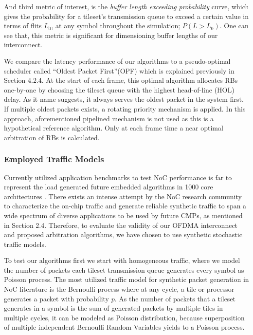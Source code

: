 And third metric of interest, is the \textit{buffer length exceeding probability} curve, which gives the probability for a tileset's transmission queue to exceed a certain value in terms of flits $L_{0}$, at any symbol throughout the simulation; $P(L>L_{0})$. One can see that, this metric is significant for dimensioning buffer lengths of our interconnect.

We compare the latency performance of our algorithms to a pseudo-optimal scheduler called \textquotedblleft Oldest Packet First\textquotedblright (OPF) which is explained previously in Section 4.2.4. At the start of each frame, this optimal algorithm allocates RBs one-by-one by choosing the tileset queue with the highest head-of-line (HOL) delay. As it name suggests, it always serves the oldest packet in the system first. If multiple oldest packets exists, a rotating priority mechanism is applied. In this approach, aforementioned pipelined mechanism is not used as this is a hypothetical reference algorithm. Only at each frame time a near optimal arbitration of RBs is calculated.  

\subsubsection{Employed Traffic Models}

Currently utilized application benchmarks to test NoC performance is far to represent the load generated future embedded algorithms in 1000 core architectures \cite{kurian2010atac}\cite{bienia2008parsec}\cite{woo1995splash}. There exists an intense attempt by the NoC research community to characterize the on-chip traffic and generate reliable synthetic traffic to span a wide spectrum of diverse applications to be used by future CMPs, as mentioned in Section 2.4. Therefore, to evaluate the validity of our OFDMA interconnect and proposed arbitration algorithms, we have chosen to use synthetic stochastic traffic models. 

To test our algorithms first we start with homogeneous traffic, where we model the number of packets each tileset transmission queue generates every symbol as Poisson process. The most utilized traffic model for synthetic packet generation in NoC literature is the Bernoulli process where at any cycle, a tile or processor generates a packet with probability $p$. As the number of packets that a tileset generates in a symbol is the sum of generated packets by multiple tiles in multiple cycles, it can be modeled as Poisson distribution, because superposition of multiple independent Bernoulli Random Variables yields to a Poisson process.

